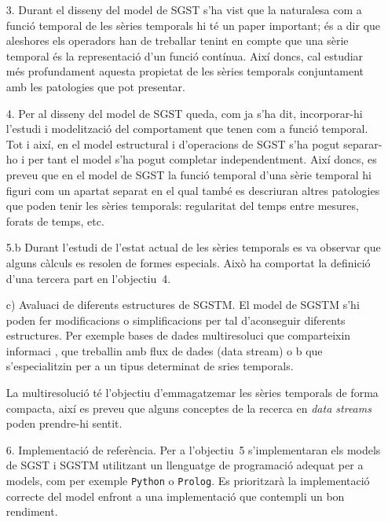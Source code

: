 \begin{itemize}

\item[3.] Durant el disseny del model de SGST s'ha vist que la
  naturalesa com a funció temporal de les sèries temporals hi té un
  paper important; és a dir que aleshores els operadors han de
  treballar tenint en compte que una sèrie temporal és la
  representació d'un funció contínua. Així doncs, cal estudiar més
  profundament aquesta propietat de les sèries temporals conjuntament
  amb les patologies que pot presentar. 


\item[4.] Per al disseny del model de SGST queda, com ja s'ha dit,
  incorporar-hi l'estudi i modelització del comportament que tenen com
  a funció temporal. Tot i així, en el model estructural i
  d'operacions de SGST s'ha pogut separar-ho i per tant el model s'ha
  pogut completar independentment. Així doncs, es preveu que en el
  model de SGST la funció temporal d'una sèrie temporal hi figuri com
  un apartat separat en el qual també es descriuran altres patologies
  que poden tenir les sèries temporals: regularitat del temps entre
  mesures, forats de temps, etc.


\item[5.b] Durant l'estudi de l'estat actual de les sèries temporals es va observar que alguns càlculs es resolen de formes especials. Això ha comportat la definició d'una tercera part en l'objectiu~4.

\todo{}
c) Avaluaci  de diferents estructures de SGSTM. El model de SGSTM s’hi poden
fer modificacions o simplificacions per tal d’aconseguir diferents estructures.
Per exemple bases de dades multiresoluci  que comparteixin informaci , que
treballin amb flux de dades (data stream) o b que s’especialitzin per a un
tipus determinat de sries temporals.


La multiresolució té l'objectiu d'emmagatzemar
  les sèries temporals de forma compacta, així es preveu que alguns
  conceptes de la recerca en \emph{data streams} poden prendre-hi
  sentit.




\item[6.] Implementació de referència. Per a l'objectiu~5 s'implementaran
  els models de SGST i SGSTM utilitzant un llenguatge de programació adequat
  per a models, com per exemple \texttt{Python} o \texttt{Prolog}.  Es
  prioritzarà la implementació correcte del model enfront a una
  implementació que contempli un bon rendiment. 



\end{itemize}
